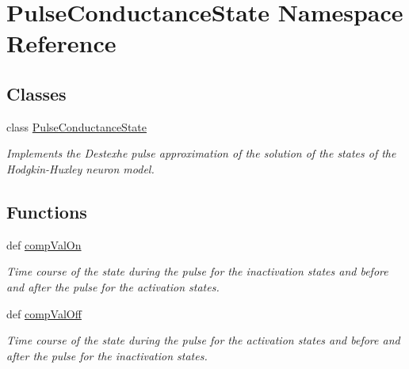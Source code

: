\hypertarget{namespace_pulse_conductance_state}{\section{Pulse\-Conductance\-State Namespace Reference}
\label{namespace_pulse_conductance_state}
}
\subsection*{Classes}
\begin{DoxyCompactItemize}
\item 
class \hyperlink{class_pulse_conductance_state_1_1_pulse_conductance_state}{Pulse\-Conductance\-State}
\begin{DoxyCompactList}\small\item\em Implements the Destexhe pulse approximation of the solution of the states of the Hodgkin-\/\-Huxley neuron model. \end{DoxyCompactList}\end{DoxyCompactItemize}
\subsection*{Functions}
\begin{DoxyCompactItemize}
\item 
def \hyperlink{namespace_pulse_conductance_state_ab354e94cc78939492454ad81c2e86223}{comp\-Val\-On}
\begin{DoxyCompactList}\small\item\em Time course of the state during the pulse for the {\itshape inactivation} states and before and after the pulse for the {\itshape activation} states. \end{DoxyCompactList}\item 
def \hyperlink{namespace_pulse_conductance_state_a1cd804c6d3299a3ee17a4e96628e9ec7}{comp\-Val\-Off}
\begin{DoxyCompactList}\small\item\em Time course of the state during the pulse for the {\itshape activation} states and before and after the pulse for the {\itshape inactivation} states. \end{DoxyCompactList}\end{DoxyCompactItemize}


